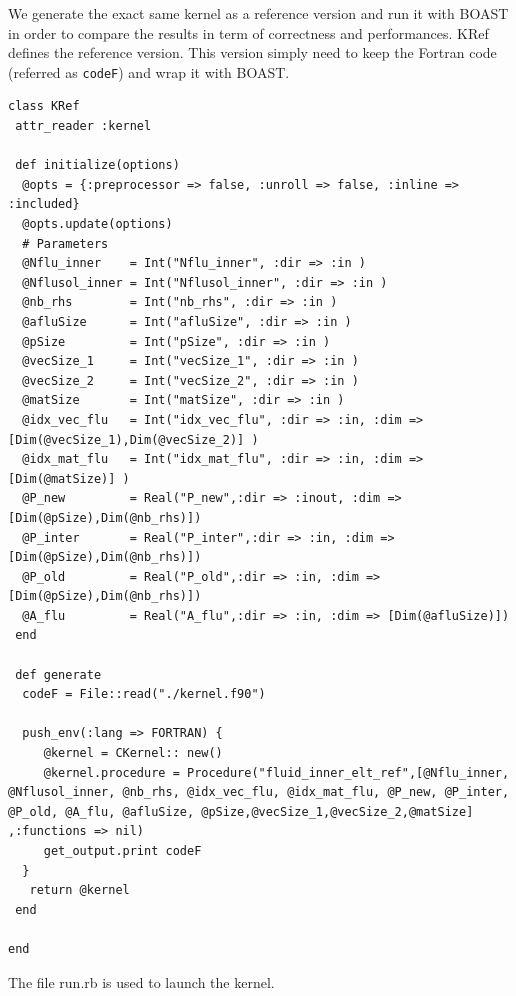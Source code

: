 \documentclass[10pt,twoside]{article}   	%
\begin{document}
We generate the exact same kernel as a reference version and run it with BOAST in order to compare the results in term of correctness and performances. KRef defines the reference version. This version simply need to keep the Fortran code (referred as \texttt{codeF}) and wrap it with BOAST.

\lstset{language=RUBY}
\begin{lstlisting}[caption=KRef.rb]
class KRef
 attr_reader :kernel

 def initialize(options)
  @opts = {:preprocessor => false, :unroll => false, :inline => :included}
  @opts.update(options)
  # Parameters 
  @Nflu_inner    = Int("Nflu_inner", :dir => :in )
  @Nflusol_inner = Int("Nflusol_inner", :dir => :in )
  @nb_rhs        = Int("nb_rhs", :dir => :in )
  @afluSize      = Int("afluSize", :dir => :in )
  @pSize         = Int("pSize", :dir => :in )
  @vecSize_1     = Int("vecSize_1", :dir => :in )
  @vecSize_2     = Int("vecSize_2", :dir => :in )
  @matSize       = Int("matSize", :dir => :in )
  @idx_vec_flu   = Int("idx_vec_flu", :dir => :in, :dim => [Dim(@vecSize_1),Dim(@vecSize_2)] )
  @idx_mat_flu   = Int("idx_mat_flu", :dir => :in, :dim => [Dim(@matSize)] )
  @P_new         = Real("P_new",:dir => :inout, :dim => [Dim(@pSize),Dim(@nb_rhs)])
  @P_inter       = Real("P_inter",:dir => :in, :dim => [Dim(@pSize),Dim(@nb_rhs)])
  @P_old         = Real("P_old",:dir => :in, :dim => [Dim(@pSize),Dim(@nb_rhs)])
  @A_flu         = Real("A_flu",:dir => :in, :dim => [Dim(@afluSize)])
 end

 def generate
  codeF = File::read("./kernel.f90")

  push_env(:lang => FORTRAN) {
     @kernel = CKernel:: new()
     @kernel.procedure = Procedure("fluid_inner_elt_ref",[@Nflu_inner, @Nflusol_inner, @nb_rhs, @idx_vec_flu, @idx_mat_flu, @P_new, @P_inter, @P_old, @A_flu, @afluSize, @pSize,@vecSize_1,@vecSize_2,@matSize] ,:functions => nil)
     get_output.print codeF
  }
   return @kernel
 end
 
end
\end{lstlisting}

The file run.rb is used to launch the kernel. 
\end{document}
